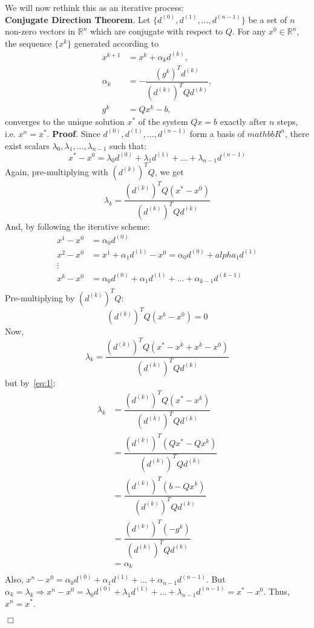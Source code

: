 \documentclass[11pt]{article}
\begin{document}
%
\vskip0.5cm \noindent We will now rethink this as an iterative process:
\\\textbf{Conjugate Direction Theorem}. Let $\{d^{(0)},d^{(1)},\dotsc,d^{(n-1)}\}$
be a set of $n$ non-zero vectors in $\mathbb{R}^n$ which are conjugate with respect
to $Q$. For any $x^0\in\mathbb{R}^n$, the sequence $\{x^k\}$ generated according to
\begin{align*}
    x^{k+1}&=x^k+\alpha_kd^{(k)},\\
    \alpha_k&=-\dfrac{(g^k)^Td^{(k)}}{(d^{(k)})^TQd^{(k)}},\\
    g^k&=Qx^k-b,
\end{align*}
converges to the unique solution $x^*$ of the system $Qx=b$ exactly after $n$ steps,
i.e. $x^n=x^*$.
%
\vskip0.5cm\noindent\textbf{Proof}. Since $d^{(0)},d^{(1)},\dotsc,d^{(n-1)}$ form
a basis of $mathbb{R}^n$, there exist scalars \(\lambda_0,\lambda_1,\dotsc, \lambda_{n-1}\)
such that:
\[x^*-x^0=\lambda_0d^{(0)}+\lambda_1d^{(1)}+\dotsc+\lambda_{n-1}d^{(n-1)}\]
Again, pre-multiplying with $(d^{(k)})^TQ$, we get
\[\lambda_k=\dfrac{(d^{(k)})^TQ(x^*-x^0)}{(d^{(k)})^TQd^{(k)}}\]
And, by following the iterative scheme:
\begin{align*}
    x^1-x^0&=\alpha_0d^{(0)}\\
    x^2-x^0&=x^1+\alpha_1d^{(1)}-x^0=\alpha_0d^{(0)}+alpha_1d^{(1)}\\
    \vdots\quad&\\
    x^k-x^0&=\alpha_0d^{(0)}+\alpha_1d^{(1)}+\dotsc+\alpha_{k-1}d^{(k-1)}\\
\end{align*}
Pre-multiplying by $(d^{(k)})^TQ$:
\begin{equation}(d^{(k)})^TQ(x^k-x^0)=0\label{eq:1}\end{equation}
Now,
\[\lambda_k=\dfrac{(d^{(k)})^TQ(x^*-x^k+x^k-x^0)}{(d^{(k)})^TQd^{(k)}}\]
but by~\ref{eq:1}:
\begin{align*}
    \lambda_k&=\dfrac{(d^{(k)})^TQ(x^*-x^k)}{(d^{(k)})^TQd^{(k)}}\\
    &=\dfrac{(d^{(k)})^T(Qx^*-Qx^k)}{(d^{(k)})^TQd^{(k)}}\\
    &=\dfrac{(d^{(k)})^T(b-Qx^k)}{(d^{(k)})^TQd^{(k)}}\\
    &=\dfrac{(d^{(k)})^T(-g^k)}{(d^{(k)})^TQd^{(k)}}\\
    &=\alpha_k\\
\end{align*}
Also, $x^n-x^0=\alpha_0d^{(0)}+\alpha_1d^{(1)}+\dotsc+\alpha_{n-1}d^{(n-1)}$. But
$\alpha_k=\lambda_k\Rightarrow x^n-x^0=\lambda_0d^{(0)}+\lambda_1d^{(1)}+\dotsc+\lambda_{n-1}d^{(n-1)}
= x^*-x^0$. Thus, $x^n=x^*$.
\par\hfill$\Box$
\end{document}
